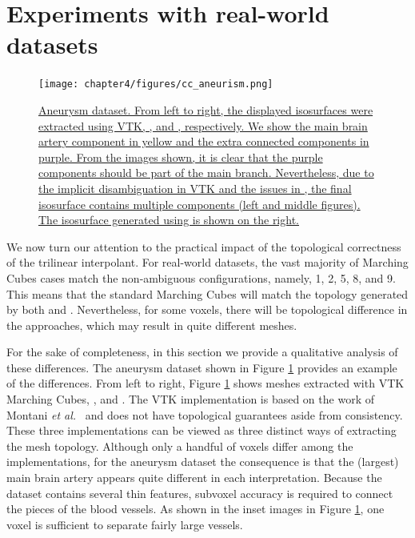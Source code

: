 

\section{Experiments with real-world datasets}

\begin{figure}[b]
     \centering
     \texttt{[image: chapter4/figures/cc\_aneurism.png]}
     \caption{\href{http://dl.dropbox.com/u/8414964/C-MC33/webpage/figure8.html}{Aneurysm dataset. From left to right, the displayed isosurfaces were extracted using VTK, \mc, and \cmc, respectively. We show the main brain artery component in yellow and the extra connected components in purple. From the images shown, it is clear that the purple components should be part of the main branch. Nevertheless, due to the implicit disambiguation in VTK and the issues in \mc, the final isosurface contains multiple components (left and middle figures). The isosurface generated using \cmc{} is shown on the right. }}
     \label{fig:cc_aneurism}
\end{figure}

We now turn our attention to the practical impact of the topological correctness of the trilinear interpolant. 
For real-world datasets, the vast majority of Marching Cubes cases match the non-ambiguous configurations, namely, 1, 2, 5, 8, and 9. This means that the standard Marching Cubes will match the topology generated by both \mc{} and \cmc.
%
Nevertheless, for some voxels, there will be topological difference in the approaches, which may result in quite different meshes. 

For the sake of completeness, in this section we provide a qualitative analysis of these differences. The aneurysm dataset shown in Figure \ref{fig:cc_aneurism} provides an example of the differences. From left to right, Figure \ref{fig:cc_aneurism} shows meshes extracted with VTK Marching Cubes, \mc, and \cmc. The VTK implementation is based on the work of Montani \emph{et al.}~\cite{Montani:1994wp} and does not have topological guarantees aside from consistency. These three implementations can be viewed as three distinct ways of extracting the mesh topology.
%
Although only a handful of voxels differ among the implementations, for the aneurysm dataset the consequence is that the (largest) main brain artery appears quite different in each interpretation. Because the dataset contains several thin features, subvoxel accuracy is required to connect the pieces of the blood vessels. As shown in the inset images in Figure \ref{fig:cc_aneurism}, one voxel is sufficient to separate fairly large vessels.

